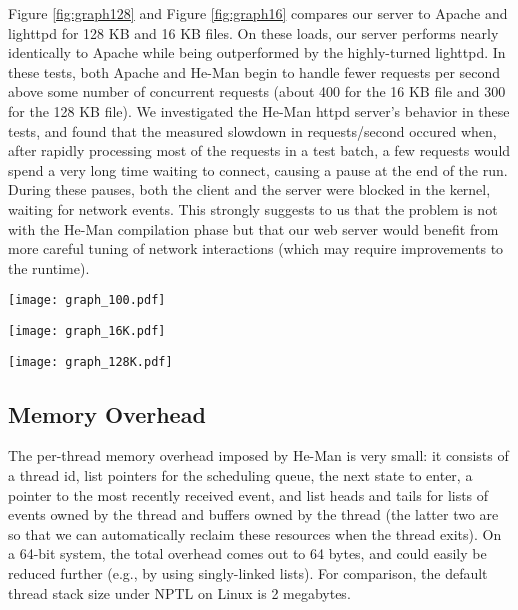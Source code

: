 \documentclass[preprint]{sigplanconf}
\begin{document}
Figure \ref{fig:graph128} and Figure \ref{fig:graph16} compares our
server to Apache and lighttpd for 128 KB and 16 KB files. On these
loads, our server performs nearly identically to Apache while being
outperformed by the highly-turned lighttpd. In these tests, both
Apache and He-Man begin to handle fewer requests per second above some
number of concurrent requests (about 400 for the 16 KB file and 300
for the 128 KB file). We investigated the He-Man httpd server's
behavior in these tests, and found that the measured slowdown in
requests/second occured when, after rapidly processing most of the
requests in a test batch, a few requests would spend a very long time
waiting to connect, causing a pause at the end of the run. During
these pauses, both the client and the server were blocked in the
kernel, waiting for network events. This strongly suggests to us that
the problem is not with the He-Man compilation phase but that our web
server would benefit from more careful tuning of network interactions
(which may require improvements to the runtime).


\begin{figure*}[!ht]
\centering
\texttt{[image: graph\_100.pdf]}
\caption{Web server benchmark, 100 byte file.}
\label{fig:graph100}
\end{figure*}
\begin{figure*}[!ht]
\centering
\texttt{[image: graph\_16K.pdf]}
\caption{Web server benchmark, 16 KB file.}
\label{fig:graph16}
\end{figure*}
\begin{figure*}[!ht]
\centering
\texttt{[image: graph\_128K.pdf]}
\caption{Web server benchmark, 128 KB file.}
\label{fig:graph128}
\end{figure*}

\subsection{Memory Overhead}

The per-thread memory overhead imposed by He-Man is very small: it
consists of a thread id, list pointers for the scheduling queue, the
next state to enter, a pointer to the most recently received event,
and list heads and tails for lists of events owned by the thread and
buffers owned by the thread (the latter two are so that we can
automatically reclaim these resources when the thread exits). On a
64-bit system, the total overhead comes out to 64 bytes, and could
easily be reduced further (e.g., by using singly-linked lists).  For
comparison, the default thread stack size under NPTL on Linux is 2
megabytes.
\end{document}
